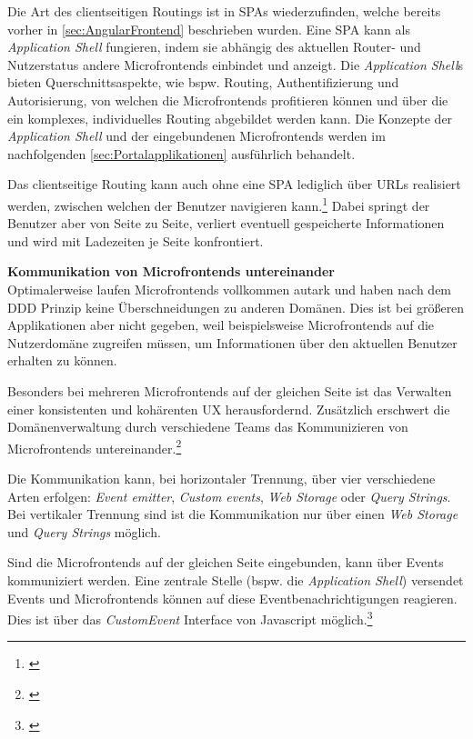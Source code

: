 Die Art des clientseitigen Routings ist in \gls{SPA}s wiederzufinden, welche bereits vorher in \cref{sec:AngularFrontend} beschrieben wurden. Eine \gls{SPA} kann als \textit{Application Shell} fungieren, indem sie abhängig des aktuellen Router- und Nutzerstatus andere Microfrontends einbindet und anzeigt. Die \textit{Application Shell}s bieten Querschnittsaspekte, wie bspw. Routing, Authentifizierung und Autorisierung, von welchen die Microfrontends profitieren können und über die ein komplexes, individuelles Routing abgebildet werden kann. Die Konzepte der \textit{Application Shell} und der eingebundenen Microfrontends werden im nachfolgenden \cref{sec:Portalapplikationen} ausführlich behandelt.

Das clientseitige Routing kann auch ohne eine \gls{SPA} lediglich über \gls{URL}s realisiert werden, zwischen welchen der Benutzer navigieren kann.\footnote{\cite[vgl.][32]{Mezzalira2021}} Dabei springt der Benutzer aber von Seite zu Seite, verliert eventuell gespeicherte Informationen und wird mit Ladezeiten je Seite konfrontiert.

\textbf{Kommunikation von Microfrontends untereinander}\\
Optimalerweise laufen Microfrontends vollkommen autark und haben nach dem \gls{DDD} Prinzip keine Überschneidungen zu anderen Domänen. Dies ist bei größeren Applikationen aber nicht gegeben, weil beispielsweise Microfrontends auf die Nutzerdomäne zugreifen müssen, um Informationen über den aktuellen Benutzer erhalten zu können.

Besonders bei mehreren Microfrontends auf der gleichen Seite ist das Verwalten einer konsistenten und kohärenten \gls{UX} herausfordernd. Zusätzlich erschwert die Domänenverwaltung durch verschiedene Teams das Kommunizieren von Microfrontends untereinander.\footnote{\cite[vgl.][33]{Mezzalira2021}}

Die Kommunikation kann, bei horizontaler Trennung, über vier verschiedene Arten erfolgen: \textit{Event emitter}, \textit{Custom events}, \textit{Web Storage} oder \textit{Query Strings}. Bei vertikaler Trennung sind ist die Kommunikation nur über einen \textit{Web Storage} und \textit{Query Strings} möglich.

Sind die Microfrontends auf der gleichen Seite eingebunden, kann über Events kommuniziert werden. Eine zentrale Stelle (bspw. die \textit{Application Shell}) versendet Events und Microfrontends können auf diese Eventbenachrichtigungen reagieren. Dies ist über das \textit{CustomEvent} Interface von Javascript möglich.\footnote{\cite[vgl.][]{MDNWebDocs2022b}}

